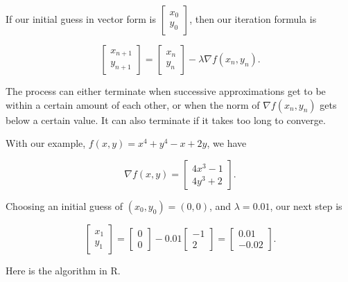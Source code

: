 \documentclass[
]{book}
\theoremstyle{definition}
\theoremstyle{definition}
\theoremstyle{definition}
\theoremstyle{definition}
\theoremstyle{remark}
\begin{document}
If our initial guess in vector form is \(\begin{bmatrix}x_0\\y_0\end{bmatrix}\), then our iteration formula is

\[\begin{bmatrix}x_{n+1}\\y_{n+1}\end{bmatrix}=\begin{bmatrix}x_{n}\\y_{n}\end{bmatrix}-\lambda \nabla f(x_n,y_n).\]

The process can either terminate when successive approximations get to be within a certain amount of each other, or when the norm of \(\nabla f(x_n,y_n)\) gets below a certain value. It can also terminate if it takes too long to converge.

With our example, \(f(x,y)=x^4+y^4-x+2y\), we have

\[\nabla f(x,y)=\begin{bmatrix}4x^3-1\\4y^3+2\end{bmatrix}.\]

Choosing an initial guess of \((x_0,y_0)=(0,0)\), and \(\lambda=0.01\), our next step is

\[\begin{bmatrix} x_1\\y_1\end{bmatrix}=\begin{bmatrix}0\\0\end{bmatrix}-0.01\left[\begin{array}{r}-1\\2\end{array}\right]=\left[\begin{array}{r}0.01\\-0.02\end{array}\right].\]

Here is the algorithm in R.
\end{document}
